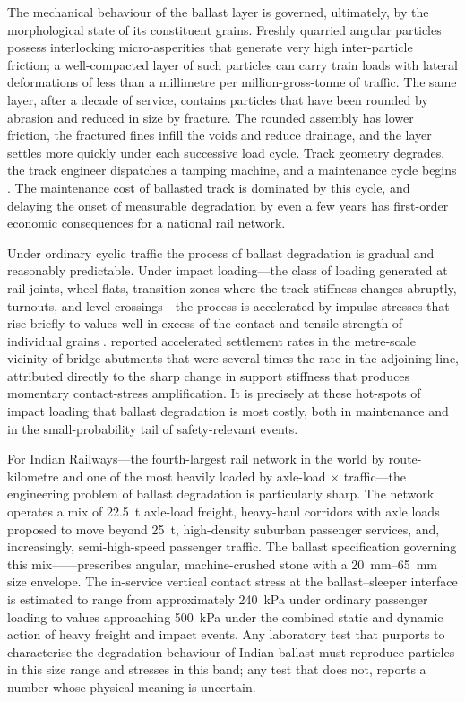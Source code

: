 The mechanical behaviour of the ballast layer is governed, ultimately, by
the morphological state of its constituent grains. Freshly quarried angular
particles possess interlocking micro-asperities that generate very high
inter-particle friction; a well-compacted layer of such particles can carry
train loads with lateral deformations of less than a millimetre per
million-gross-tonne of traffic. The same layer, after a decade of service,
contains particles that have been rounded by abrasion and reduced in size by
fracture. The rounded assembly has lower friction, the fractured fines infill
the voids and reduce drainage, and the layer settles more quickly under each
successive load cycle. Track geometry degrades, the track engineer
dispatches a tamping machine, and a maintenance cycle begins
\citep{Esveld2001,Indraratna2011}. The maintenance cost of ballasted track
is dominated by this cycle, and delaying the onset of measurable degradation
by even a few years has first-order economic consequences for a national
rail network.

Under ordinary cyclic traffic the process of ballast degradation is gradual
and reasonably predictable. Under impact loading---the class of loading
generated at rail joints, wheel flats, transition zones where the track
stiffness changes abruptly, turnouts, and level crossings---the process is
accelerated by impulse stresses that rise briefly to values well in excess
of the contact and tensile strength of individual grains
\citep{Remennikov2008}. \citet{Li2005} reported accelerated settlement rates
in the metre-scale vicinity of bridge abutments that were several times the
rate in the adjoining line, attributed directly to the sharp change in
support stiffness that produces momentary contact-stress amplification. It
is precisely at these hot-spots of impact loading that ballast degradation
is most costly, both in maintenance and in the small-probability tail of
safety-relevant events.

For Indian Railways---the fourth-largest rail network in the world by
route-kilometre and one of the most heavily loaded by axle-load $\times$
traffic---the engineering problem of ballast degradation is particularly
sharp. The network operates a mix of \SI{22.5}{\tonne} axle-load freight,
heavy-haul corridors with axle loads proposed to move beyond
\SI{25}{\tonne}, high-density suburban passenger services, and,
increasingly, semi-high-speed passenger traffic. The ballast specification
governing this mix---\citet{RDSO2023}---prescribes angular, machine-crushed
stone with a \SIrange{20}{65}{\milli\metre} size envelope. The in-service
vertical contact stress at the ballast--sleeper interface is estimated to
range from approximately \SI{240}{\kilo\pascal} under ordinary passenger
loading to values approaching \SI{500}{\kilo\pascal} under the combined
static and dynamic action of heavy freight and impact events. Any
laboratory test that purports to characterise the degradation behaviour of
Indian ballast must reproduce particles in this size range and stresses in
this band; any test that does not, reports a number whose physical meaning
is uncertain.

